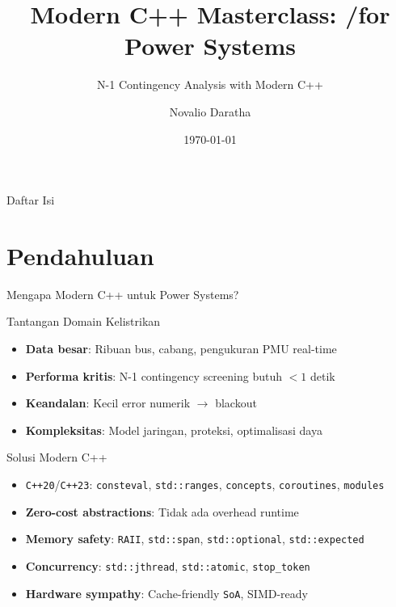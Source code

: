 \documentclass[aspectratio=169,10pt]{beamer}
\title[Modern C++ Masterclass]{Modern C++ Masterclass: \cpptwenty/\cpptwentythree for Power Systems}
\subtitle{N-1 Contingency Analysis with Modern C++}
\author[Novalio Daratha]{Novalio Daratha}
\institute[UNIB]{Fakultas Teknik, Universitas Bengkulu}
\date[\today]{\today}
\newcommand{\cpptwenty}{\texttt{C++20}}
\newcommand{\cpptwentythree}{\texttt{C++23}}
\newcommand{\consteval}{\texttt{consteval}}
\newcommand{\stdspan}{\texttt{std::span}}
\newcommand{\optional}{\texttt{std::optional}}
\newcommand{\expected}{\texttt{std::expected}}
\newcommand{\jthread}{\texttt{std::jthread}}
\newcommand{\atomic}{\texttt{std::atomic}}
\newcommand{\ranges}{\texttt{std::ranges}}
\newcommand{\concepts}{\texttt{concepts}}
\newcommand{\SoA}{\texttt{SoA}}
\newcommand{\RAII}{\texttt{RAII}}
\newcommand{\modules}{\texttt{modules}}
\newcommand{\coroutines}{\texttt{coroutines}}
\newcommand{\stoptoken}{\texttt{stop\_token}}
\begin{document}
\begin{frame}
  \titlepage
\end{frame}

\begin{frame}{Daftar Isi}
  \tableofcontents
\end{frame}

\section{Pendahuluan}

\begin{frame}{Mengapa Modern C++ untuk Power Systems?}
  \begin{block}{Tantangan Domain Kelistrikan}
    \begin{itemize}
      \item \textbf{Data besar}: Ribuan bus, cabang, pengukuran PMU real-time
      \item \textbf{Performa kritis}: N-1 contingency screening butuh $< 1$ detik
      \item \textbf{Keandalan}: Kecil error numerik $\rightarrow$ blackout
      \item \textbf{Kompleksitas}: Model jaringan, proteksi, optimalisasi daya
    \end{itemize}
  \end{block}
  
  \begin{block}{Solusi Modern C++}
    \begin{itemize}
      \item \cpptwenty/\cpptwentythree: \consteval, \ranges, \concepts, \coroutines, \modules
      \item \textbf{Zero-cost abstractions}: Tidak ada overhead runtime
      \item \textbf{Memory safety}: \RAII, \stdspan, \optional, \expected
      \item \textbf{Concurrency}: \jthread, \atomic, \stoptoken
      \item \textbf{Hardware sympathy}: Cache-friendly \SoA, SIMD-ready
    \end{itemize}
  \end{block}
\end{frame}
\end{document}
